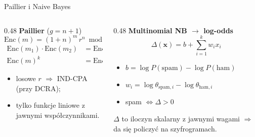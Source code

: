 \documentclass[aspectratio=169,11pt]{beamer}
\begin{document}
\begin{frame}{Paillier i Naive Bayes}
  \begin{columns}[T]
    \begin{column}{0.48\textwidth}
      \textbf{Paillier} ($g = n + 1$)
      \[ \mathrm{Enc}(m) = (1+n)^m\, r^n \bmod n^2 \]
      \begin{align*}
        \mathrm{Enc}(m_1)\cdot\mathrm{Enc}(m_2) &= \mathrm{Enc}(m_1 + m_2)\\
        \mathrm{Enc}(m)^k &= \mathrm{Enc}(k\,m)
      \end{align*}
      \begin{itemize}
        \item losowe $r$ $\Rightarrow$ IND-CPA (przy DCRA);
        \item tylko funkcje liniowe z jawnymi współczynnikami.
      \end{itemize}
    \end{column}
    \begin{column}{0.48\textwidth}
      \textbf{Multinomial NB $\to$ log-odds}
      \[ \Delta(\mathbf{x}) = b + \sum_{i=1}^{k} w_i x_i \]
      \begin{itemize}
        \item $b = \log P(\text{spam}) - \log P(\text{ham})$
        \item $w_i = \log\theta_{\text{spam},i} - \log\theta_{\text{ham},i}$
        \item spam $\Leftrightarrow \Delta > 0$
      \end{itemize}
      \vspace{0.3em}
      $\Delta$ to iloczyn skalarny z jawnymi wagami $\Rightarrow$ \alert{da się policzyć na szyfrogramach}.
    \end{column}
  \end{columns}
\end{frame}
\end{document}
